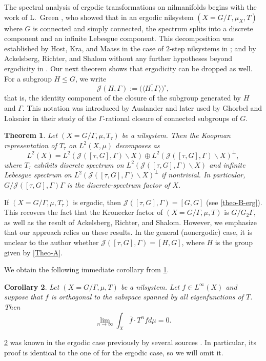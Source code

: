 \documentclass[letter, 11pt]{article}
\newtheorem{theorem}{Theorem}[section]
\newtheorem{corollary}[theorem]{Corollary}
\theoremstyle{definition}
\theoremstyle{plain}
\newcommand{\1}{\mathbbm{1}}
\begin{document}
The spectral analysis of ergodic transformations on nilmanifolds begins with the work of L.\ Green
\cite{Auslander_Green_Hahn63}, who showed that in an ergodic nilsystem $(X=G/\Gamma,\mu_X, T)$ where $G$ is connected and simply connected, the spectrum splits into a discrete component and an infinite Lebesgue component. This decomposition was established by Host, Kra, and Maass in the case of $2$-step nilsystems in \cite{HKM}; and by Ackelsberg, Richter, and Shalom without any further hypotheses beyond ergodicity in \cite[Theorem 1.4]{MR4797105}. Our
next theorem shows that ergodicity can be dropped as well. For a subgroup $H\leq G$, we write
\[
\mathcal{J}(H,\Gamma):=\bigl(\overline{\langle H,\Gamma\rangle}\bigr)^{\circ},
\]
that is, the identity component of the closure of the subgroup generated by $H$ and $\Gamma$. This
notation was introduced by Auslander \cite{Auslander-63} and later used by Ghorbel and Loksaier
\cite{GK-19} in their study of the $\Gamma$-rational closure of connected subgroups of $G$.



\begin{theorem}\label{Theo-B}
Let $(X=G/\Gamma,\mu,T_{\tau})$ be a nilsystem. Then the Koopman representation of $T_{\tau}$ on $L^2(X,\mu)$ decomposes as
  $$ L^2(X)=L^2(\mathcal{J}([\tau,G],\Gamma)\backslash X)\oplus L^2(\mathcal{J}([\tau,G],\Gamma)\backslash X)^\perp,$$
  where $T_{\tau}$ exhibits discrete spectrum on $L^2(\mathcal{J}([\tau,G],\Gamma)\backslash X)$ and infinite Lebesgue spectrum on $L^2(\mathcal{J}([\tau,G],\Gamma)\backslash X)^\perp$ if nontrivial. In particular, $G/\mathcal{J}([\tau,G],\Gamma)\Gamma$ is the discrete-spectrum factor of $X$.
\end{theorem}
If $(X=G/\Gamma,\mu,T_\tau)$ is ergodic, then $\mathcal{J}([\tau,G],\Gamma)=[G,G]$ (see \cref{theo-B-erg}). This recovers the fact that the Kronecker factor of $(X=G/\Gamma,\mu,T)$ is $G/G_2\Gamma$, as well as the
result of Ackelsberg, Richter, and Shalom. However, we emphasize that our approach relies on these results. In the general (nonergodic) case, it is unclear to the author whether
$\mathcal{J}([\tau,G],\Gamma)=[H,G]$, where $H$ is the group given by \cref{Theo-A}. 

We obtain the following immediate corollary from \cref{Theo-B}.
\begin{corollary}\label{imm-coro}
    Let $(X=G/\Gamma,\mu,T)$ be a nilsystem. Let $f\in L^\infty(X)$ and suppose that $f$ is orthogonal to the subspace spanned by all eigenfunctions of $T$.  Then
    $$\lim_{n\to \infty} \int_X \overline{f}\cdot T^n f d\mu =0. $$
\end{corollary}
\cref{imm-coro} was known in the ergodic case previously by several sources \cite{Griesmer2,FranKuca,MR4797105}. In particular, its proof is identical to the one of  \cite[Theorem 1.7]{MR4797105} for the ergodic case, so we will omit it. 
\end{document}
